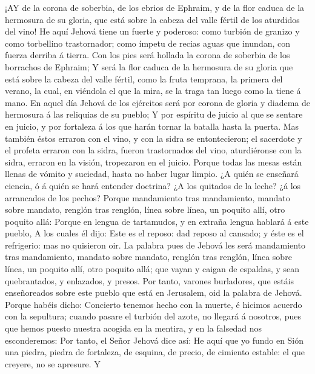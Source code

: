 ¡AY de la corona de soberbia, de los ebrios de Ephraim, y
de la flor caduca de la hermosura de su gloria, que está sobre la cabeza
del valle fértil de los aturdidos del vino!  He aquí Jehová
tiene un fuerte y poderoso: como turbión de granizo y como torbellino
trastornador; como ímpetu de recias aguas que inundan, con fuerza
derriba á tierra.  Con los pies será hollada la corona de
soberbia de los borrachos de Ephraim;  Y será la flor caduca
de la hermosura de su gloria que está sobre la cabeza del valle fértil,
como la fruta temprana, la primera del verano, la cual, en viéndola el
que la mira, se la traga tan luego como la tiene á mano.  En
aquel día Jehová de los ejércitos será por corona de gloria y diadema de
hermosura á las reliquias de su pueblo;  Y por espíritu de
juicio al que se sentare en juicio, y por fortaleza á los que harán
tornar la batalla hasta la puerta.  Mas también éstos
erraron con el vino, y con la sidra se entontecieron; el sacerdote y el
profeta erraron con la sidra, fueron trastornados del vino, aturdiéronse
con la sidra, erraron en la visión, tropezaron en el juicio.
 Porque todas las mesas están llenas de vómito y suciedad,
hasta no haber lugar limpio.  ¿A quién se enseñará ciencia,
ó á quién se hará entender doctrina? ¿A los quitados de la leche? ¿á los
arrancados de los pechos?  Porque mandamiento tras
mandamiento, mandato sobre mandato, renglón tras renglón, línea sobre
línea, un poquito allí, otro poquito allá:  Porque en
lengua de tartamudos, y en extraña lengua hablará á este pueblo,
 A los cuales él dijo: Este es el reposo: dad reposo al
cansado; y éste es el refrigerio: mas no quisieron oir.  La
palabra pues de Jehová les será mandamiento tras mandamiento, mandato
sobre mandato, renglón tras renglón, línea sobre línea, un poquito allí,
otro poquito allá; que vayan y caigan de espaldas, y sean quebrantados,
y enlazados, y presos.  Por tanto, varones burladores, que
estáis enseñoreados sobre este pueblo que está en Jerusalem, oid la
palabra de Jehová.  Porque habéis dicho: Concierto tenemos
hecho con la muerte, é hicimos acuerdo con la sepultura; cuando pasare
el turbión del azote, no llegará á nosotros, pues que hemos puesto
nuestra acogida en la mentira, y en la falsedad nos esconderemos:
 Por tanto, el Señor Jehová dice así: He aquí que yo fundo
en Sión una piedra, piedra de fortaleza, de esquina, de precio, de
cimiento estable: el que creyere, no se apresure.  Y

